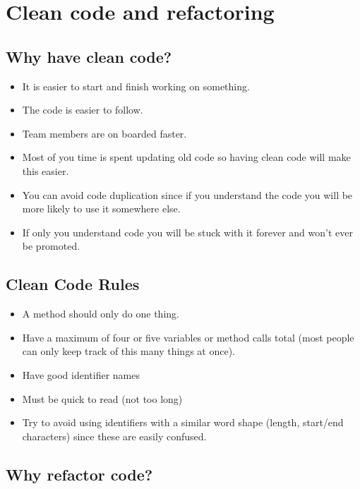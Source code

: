 \section{Clean code and refactoring}\label{sec:clean_code_and_refactoring}

\subsection{Why have clean code?}\label{sub:why_have_clean_code_}

\begin{itemize}
    \item It is easier to start and finish working on something.
    \item The code is easier to follow.
    \item Team members are on boarded faster.
    \item Most of you time is spent updating old code so having clean code will make this easier.
    \item You can avoid code duplication since if you understand the code you will be more likely to use it somewhere else.
    \item If only you understand code you will be stuck with it forever and won't ever be promoted.
\end{itemize}

\subsection{Clean Code Rules}\label{sub:clean_code_rules}

\begin{itemize}
    \item A method should only do one thing.
    \item Have a maximum of four or five variables or method calls total (most people can only keep track of this many things at once).
    \item Have good identifier names
    \item Must be quick to read (not too long)
    \item Try to avoid using identifiers with a similar word shape (length, start/end characters) since these are easily confused.
\end{itemize}

\subsection{Why refactor code?}\label{sub:why_refactor_code_}

